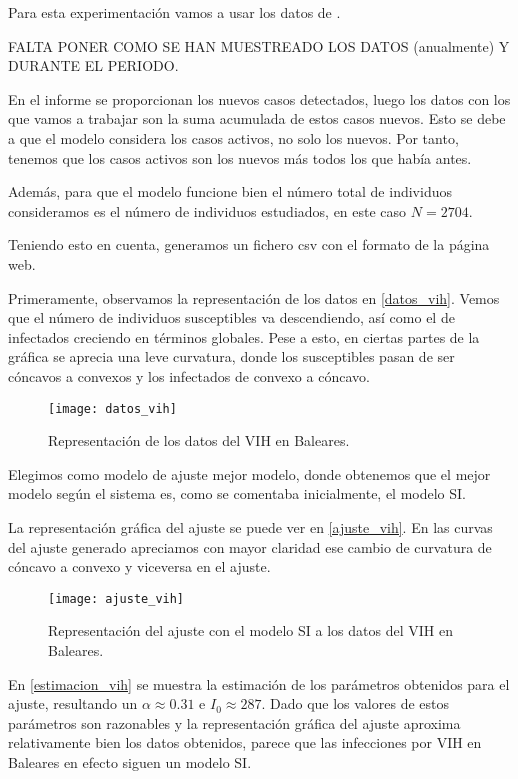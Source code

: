 Para esta experimentación vamos a usar los datos de \cite{datos_vih}.

FALTA PONER COMO SE HAN MUESTREADO LOS DATOS (anualmente) Y DURANTE EL PERIODO.

En el informe se proporcionan los nuevos casos detectados, luego los datos con los que vamos a trabajar son la suma acumulada de estos casos nuevos. Esto se debe a que el modelo considera los casos activos, no solo los nuevos. Por tanto, tenemos que los casos activos son los nuevos más todos los que había antes.

Además, para que el modelo funcione bien el número total de individuos consideramos es el número de individuos estudiados, en este caso $N=2704$.

Teniendo esto en cuenta, generamos un fichero csv con el formato de la página web.

Primeramente, observamos la representación de los datos en \eqref{datos_vih}. Vemos que el número de individuos susceptibles va descendiendo, así como el de infectados creciendo en términos globales. Pese a esto, en ciertas partes de la gráfica se aprecia una leve curvatura, donde los susceptibles pasan de ser cóncavos a convexos y los infectados de convexo a cóncavo.

\begin{figure}
\begin{center}
\caption{Representación de los datos del VIH en Baleares.}
\label{datos_vih}
\texttt{[image: datos\_vih]}
\end{center}
\end{figure}

Elegimos como modelo de ajuste mejor modelo, donde obtenemos que el mejor modelo según el sistema es, como se comentaba inicialmente, el modelo SI.

La representación gráfica del ajuste se puede ver en \eqref{ajuste_vih}. En las curvas del ajuste generado apreciamos con mayor claridad ese cambio de curvatura de cóncavo a convexo y viceversa en el ajuste. 

\begin{figure}
\begin{center}
\caption{Representación del ajuste con el modelo SI a los datos del VIH en Baleares.}
\label{ajuste_vih}
\texttt{[image: ajuste\_vih]}
\end{center}
\end{figure}

En \eqref{estimacion_vih} se muestra la estimación de los parámetros obtenidos para el ajuste, resultando un $\alpha \approx 0.31$ e $I_0 \approx 287$. Dado que los valores de estos parámetros son razonables y la representación gráfica del ajuste aproxima relativamente bien los datos obtenidos, parece que las infecciones por VIH en Baleares en efecto siguen un modelo SI.

